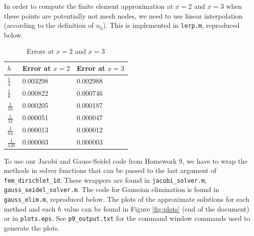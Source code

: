 \documentclass{homework}
\begin{document}
\begin{alphaparts}
		In order to compute the finite element approximation at $x=2$ and $x=3$ when these points are potentially not mesh nodes, we need to use linear interpolation (according to the definition of $u_h$). This is implemented in \verb*|lerp.m|, reproduced below.
		
		\begin{table}[h]
			\centering
			\begin{tabular}{@{}lll@{}}
				\toprule
				$h$ & Error at $x=2$ & Error at $x=3$ \\
				\midrule
				$\frac{1}{4}$ & 0.003298 & 0.002988 \\[.4em]
				$\frac{1}{8}$ & 0.000822 & 0.000746 \\[.4em]
				$\frac{1}{16}$ & 0.000205 & 0.000187 \\[.4em]
				$\frac{1}{32}$ & 0.000051 & 0.000047 \\[.4em]
				$\frac{1}{64}$ & 0.000013 & 0.000012 \\[.4em]
				$\frac{1}{128}$ & 0.000003 & 0.000003 \\[.4em]
				\bottomrule
			\end{tabular}
			\caption{Errors at $x=2$ and $x=3$}
			\label{table:errors23}
		\end{table}
	\end{alphaparts}
	
	\question
	To use our Jacobi and Gauss-Seidel code from Homework 9, we have to wrap the methods in solver functions that can be passed to the last argument of \verb*|fem_dirichlet_1d|. These wrappers are found in \verb*|jacobi_solver.m|, \verb*|gauss_seidel_solver.m|. The code for Gaussian elimination is found in \verb*|gauss_elim.m|, reproduced below. 
	The plots of the approximate solutions for each method and each $h$ value can be found in Figure \ref{fig:plots} (end of the document) or in \verb*|plots.eps|. See \verb*|p9_output.txt| for the command window commands used to generate the plots.
	
	\begin{minipage}{\linewidth}
		
	\end{minipage}
	
\end{document}
